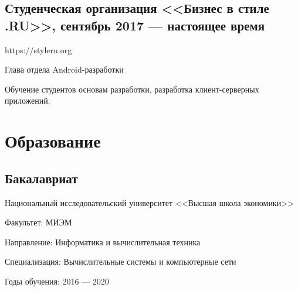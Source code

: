 \documentclass[a4paper,12pt]{article}
\begin{document}
    \subsection*{Студенческая организация <<Бизнес в стиле .RU>>, сентябрь 2017 --- настоящее время}

    https://styleru.org\par
    Глава отдела Android-разработки\par
    Обучение студентов основам разработки, разработка клиент-серверных приложений.  

    \section*{Образование}

    \subsection*{Бакалавриат}

    Национальный исследовательский университет <<Высшая школа экономики>>\par
    Факультет: МИЭМ\par
    Направление: Информатика и вычислительная техника\par
    Специализация: Вычислительные системы и компьютерные сети\par
    Годы обучения: 2016 --- 2020
\end{document}
